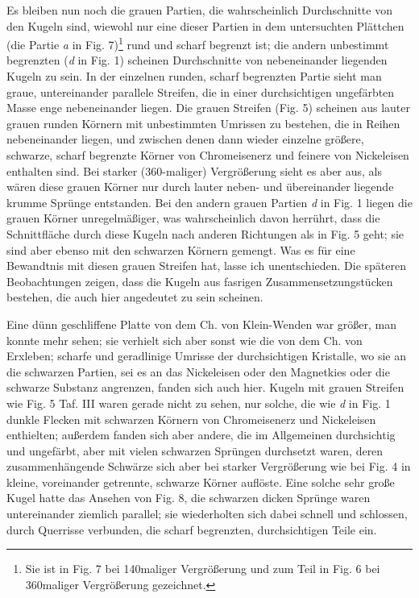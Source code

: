 \documentclass[a4paper, 11pt, oneside]{article}
\begin{document}
Es bleiben nun noch die grauen Partien, die wahrscheinlich Durchschnitte von den Kugeln sind, wiewohl nur eine dieser Partien in dem untersuchten Plättchen (die Partie \emph{a} in Fig. 7)\footnote{Sie ist in Fig. 7 bei 140maliger Vergrößerung und zum Teil in Fig. 6 bei 360maliger Vergrößerung gezeichnet.} rund und scharf begrenzt ist; die andern unbestimmt begrenzten (\emph{d} in Fig. 1) scheinen Durchschnitte von nebeneinander liegenden Kugeln zu sein. In der einzelnen runden, scharf begrenzten Partie sieht man graue, untereinander parallele Streifen, die in einer durchsichtigen ungefärbten Masse enge nebeneinander liegen. Die grauen Streifen (Fig. 5) scheinen aus lauter grauen runden Körnern mit unbestimmten Umrissen zu bestehen, die in Reihen nebeneinander liegen, und zwischen denen dann wieder einzelne größere, schwarze, scharf begrenzte Körner von Chromeisenerz und feinere von Nickeleisen enthalten sind. Bei starker (360-maliger) Vergrößerung sieht es aber aus, als wären diese grauen Körner nur durch lauter neben- und übereinander liegende krumme Sprünge entstanden. Bei den andern grauen Partien \emph{d} in Fig. 1 liegen die grauen Körner unregelmäßiger, was wahrscheinlich davon herrührt, dass die Schnittfläche durch diese Kugeln nach anderen Richtungen als in Fig. 5 geht; sie sind aber ebenso mit den schwarzen Körnern gemengt. Was es für eine Bewandtnis mit diesen grauen Streifen hat, lasse ich unentschieden. Die späteren Beobachtungen zeigen, dass die Kugeln aus fasrigen Zusammensetzungstücken bestehen, die auch hier angedeutet zu sein scheinen.

Eine dünn geschliffene Platte von dem Ch. von Klein-Wenden war größer, man konnte mehr sehen; sie verhielt sich aber sonst wie die von dem Ch. von Erxleben; scharfe und geradlinige Umrisse der durchsichtigen Kristalle, wo sie an die schwarzen Partien, sei es an das Nickeleisen oder den Magnetkies oder die schwarze Substanz angrenzen, fanden sich auch hier. Kugeln mit grauen Streifen wie Fig. 5 Taf. III waren gerade nicht zu sehen, nur solche, die wie \emph{d} in Fig. 1 dunkle Flecken mit schwarzen Körnern von Chromeisenerz und Nickeleisen enthielten; außerdem fanden sich aber andere, die im Allgemeinen durchsichtig und ungefärbt, aber mit vielen schwarzen Sprüngen durchsetzt waren, deren zusammenhängende Schwärze sich aber bei starker Vergrößerung wie bei Fig. 4 in kleine, voreinander getrennte, schwarze Körner auflöste. Eine solche sehr große Kugel hatte das Ansehen von Fig. 8, die schwarzen dicken Sprünge waren untereinander ziemlich parallel; sie wiederholten sich dabei schnell und schlossen, durch Querrisse verbunden, die scharf begrenzten, durchsichtigen Teile ein.
\end{document}
